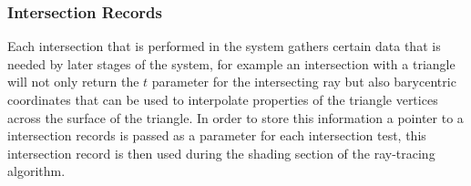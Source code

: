 \subsubsection{Intersection Records}
Each intersection that is performed in the system gathers certain data that is needed by later stages of the system, for
example an intersection with a triangle will not only return the $t$ parameter for the intersecting ray but also
barycentric coordinates that can be used to interpolate properties of the triangle vertices across the surface of the
triangle. In order to store this information a pointer to a intersection records is passed as a parameter for each
intersection test, this intersection record is then used during the shading section of the ray-tracing algorithm.


\newpage

\newpage

